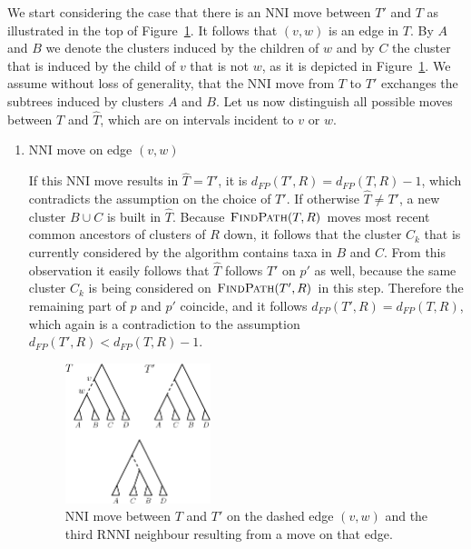 \documentclass{amsart}
\newcommand{\rnni}{\mathrm{RNNI}}
\newcommand{\findpath}{\textsc{FindPath}}
\newcommand{\nni}{\mathrm{NNI}}
\begin{document}
We start considering the case that there is an $\nni$ move between $T'$ and $T$ as illustrated in the top of Figure~\ref{fig:thm_fp_nni1}.
It follows that $(v,w)$ is an edge in $T$.
By $A$ and $B$ we denote the clusters induced by the children of $w$ and by $C$ the cluster that is induced by the child of $v$ that is not $w$, as it is depicted in Figure~\ref{fig:thm_fp_nni1}.
We assume without loss of generality, that the $\nni$ move from $T$ to $T'$ exchanges the subtrees induced by clusters $A$ and $B$.
Let us now distinguish all possible moves between $T$ and $\hat T$, which are on intervals incident to $v$ or $w$.

\begin{enumerate}
    \item $\nni$ move on edge $(v,w)$

    If this $\nni$ move results in $\hat T = T'$, it is $d_{FP}(T',R) = d_{FP}(T,R) - 1$, which contradicts the assumption on the choice of $T'$.
    If otherwise $\hat T \neq T'$, a new cluster $B \cup C$ is built in $\hat T$.
    Because $\findpath(T,R)$ moves most recent common ancestors of clusters of $R$ down, it follows that the cluster $C_k$ that is currently considered by the algorithm contains taxa in $B$ and $C$.
    From this observation it easily follows that $\hat T$ follows $T'$ on $p'$ as well, because the same cluster $C_k$ is being considered on $\findpath(T',R)$ in this step.
    Therefore the remaining part of $p$ and $p'$ coincide, and it follows $d_{FP}(T',R) = d_{FP}(T,R)$, which again is a contradiction to the assumption $d_{FP}(T',R) < d_{FP}(T,R) - 1$.

    \begin{figure}[!hbt]
    \centering
    \includegraphics[width=0.4\textwidth]{thm_fp_nni1}
    \vspace{12pt}
    \caption{$\nni$ move between $T$ and $T'$ on the dashed edge $(v,w)$ and the third $\rnni$ neighbour resulting from a move on that edge.}
    \label{fig:thm_fp_nni1}
    \end{figure}


\end{enumerate}
\end{document}
